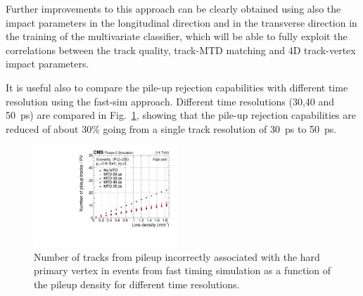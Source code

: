 Further improvements to this approach can be clearly obtained using also the impact parameters in the longitudinal direction and in the transverse direction in the training of the multivariate classifier, which will be able to fully exploit the correlations between the track quality, track-MTD matching and 4D track-vertex impact parameters. 

It is useful also to compare the pile-up rejection capabilities with different time resolution using the fast-sim approach. Different time resolutions (30,40 and 50~ps) are compared in Fig.~\ref{fig:purej_tres_comp}, showing that the pile-up rejection capabilities are reduced of about 30\% going from a single track resolution of 30~ps to 50~ps.

\begin{figure}[!phtb]
\centering
\includegraphics[width=0.48\textwidth]{fig/performance/purej/ForApproval/nputracks_fastsim_tres.pdf}
 \caption{Number of tracks from pileup incorrectly 
   associated with the hard primary vertex in \ttbar events from fast timing
   simulation as a function of the pileup density for different time resolutions.}
   \label{fig:purej_tres_comp}
\end{figure}
